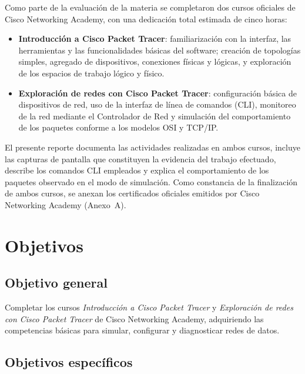 \documentclass[11pt,a4paper]{article}
\begin{document}
Como parte de la evaluación de la materia se completaron dos cursos oficiales
de Cisco Networking Academy, con una dedicación total estimada de cinco horas:

\begin{itemize}
  \item \textbf{Introducción a Cisco Packet Tracer}: familiarización con la
        interfaz, las herramientas y las funcionalidades básicas del software;
        creación de topologías simples, agregado de dispositivos, conexiones
        físicas y lógicas, y exploración de los espacios de trabajo lógico y
        físico.
  \item \textbf{Exploración de redes con Cisco Packet Tracer}: configuración
        básica de dispositivos de red, uso de la interfaz de línea de comandos
        (CLI), monitoreo de la red mediante el Controlador de Red y simulación
        del comportamiento de los paquetes conforme a los modelos OSI y TCP/IP.
\end{itemize}

El presente reporte documenta las actividades realizadas en ambos cursos, incluye
las capturas de pantalla que constituyen la evidencia del trabajo efectuado,
describe los comandos CLI empleados y explica el comportamiento de los paquetes
observado en el modo de simulación. Como constancia de la finalización de ambos
cursos, se anexan los certificados oficiales emitidos por Cisco Networking
Academy (Anexo~A).

\section{Objetivos}

\subsection{Objetivo general}

Completar los cursos \textit{Introducción a Cisco Packet Tracer} y
\textit{Exploración de redes con Cisco Packet Tracer} de Cisco Networking
Academy, adquiriendo las competencias básicas para simular, configurar y
diagnosticar redes de datos.

\subsection{Objetivos específicos}
\end{document}
